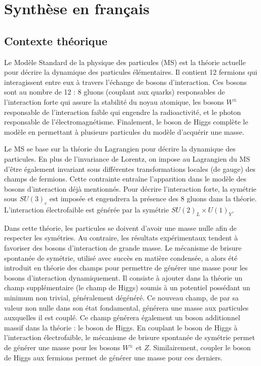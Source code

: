 \chapter*{Synthèse en français}

\section{Contexte théorique}
Le Modèle Standard de la physique des particules (MS) est la théorie actuelle pour décrire la dynamique des particules élémentaires.
Il contient 12 fermions qui interagissent entre eux à travers l'échange de bosons d'interaction.
Ces bosons sont au nombre de 12 : 8 gluons (couplant aux quarks) responsables de l'interaction forte qui assure la stabilité du noyau atomique, les bosons $W^\pm$ responsable de l'interaction faible qui engendre la radioactivité, et le photon responsable de l'électromagnétisme.
Finalement, le boson de Higgs complète le modèle en permettant à plusieurs particules du modèle d'acquérir une masse.

Le MS se base sur la théorie du Lagrangien pour décrire la dynamique des particules.
En plus de l'invariance de Lorentz, on impose au Lagrangien du MS d'être également invariant sous différentes transformations locales (de gauge) des champs de fermions.
Cette contrainte entraîne l'apparition dans le modèle des bosons d'interaction déjà mentionnés.
Pour décrire l'interaction forte, la symétrie sous $SU(3)_c$ est imposée et engendrera la présence des 8 gluons dans la théorie.
L'interaction électrofaible est générée par la symétrie $SU(2)_L\times U(1)_Y$.

Dans cette théorie, les particules se doivent d'avoir une masse nulle afin de respecter les symétries.
Au contraire, les résultats expérimentaux tendent à favoriser des bosons d'interaction de grande masse.
Le mécanisme de brisure spontanée de symétrie, utilisé avec succès en matière condensée, a alors été introduit en théorie des champs pour permettre de générer une masse pour les bosons d'interaction dynamiquement.
Il consiste à ajouter dans la théorie un champ supplémentaire (le champ de Higgs) soumis à un potentiel possédant un minimum non trivial, généralement dégénéré.
Ce nouveau champ, de par sa valeur non nulle dans son état fondamental, générera une masse aux particules auxquelles il est couplé.
Ce champ générera également un boson additionnel massif dans la théorie : le boson de Higgs.
En couplant le boson de Higgs à l'interaction électrofaible, le mécanisme de brisure spontanée de symétrie permet de générer une masse pour les bosons $W^\pm$ et $Z$.
Similairement, coupler le boson de Higgs aux fermions permet de générer une masse pour ces derniers.

